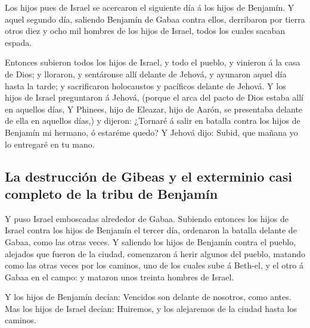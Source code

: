  Los hijos pues de Israel se acercaron el siguiente día á
los hijos de Benjamín.  Y aquel segundo día, saliendo
Benjamín de Gabaa contra ellos, derribaron por tierra otros diez y ocho
mil hombres de los hijos de Israel, todos los cuales sacaban espada.

 Entonces subieron todos los hijos de Israel, y todo el
pueblo, y vinieron á la casa de Dios; y lloraron, y sentáronse allí
delante de Jehová, y ayunaron aquel día hasta la tarde; y sacrificaron
holocaustos y pacíficos delante de Jehová.  Y los hijos
de Israel preguntaron á Jehová, (porque el arca del pacto de Dios estaba
allí en aquellos días,  Y Phinees, hijo de Eleazar, hijo
de Aarón, se presentaba delante de ella en aquellos días,) y dijeron:
¿Tornaré á salir en batalla contra los hijos de Benjamín mi hermano, ó
estaréme quedo? Y Jehová dijo: Subid, que mañana yo lo entregaré en tu
mano.

\hypertarget{la-destrucciuxf3n-de-gibeas-y-el-exterminio-casi-completo-de-la-tribu-de-benjamuxedn}{%
\subsection{La destrucción de Gibeas y el exterminio casi completo de la
tribu de
Benjamín}\label{la-destrucciuxf3n-de-gibeas-y-el-exterminio-casi-completo-de-la-tribu-de-benjamuxedn}}

 Y puso Israel emboscadas alrededor de Gabaa.
 Subiendo entonces los hijos de Israel contra los hijos
de Benjamín el tercer día, ordenaron la batalla delante de Gabaa, como
las otras veces.  Y saliendo los hijos de Benjamín contra
el pueblo, alejados que fueron de la ciudad, comenzaron á herir algunos
del pueblo, matando como las otras veces por los caminos, uno de los
cuales sube á Beth-el, y el otro á Gabaa en el campo: y mataron unos
treinta hombres de Israel.

 Y los hijos de Benjamín decían: Vencidos son delante de
nosotros, como antes. Mas los hijos de Israel decían: Huiremos, y los
alejaremos de la ciudad hasta los caminos.

